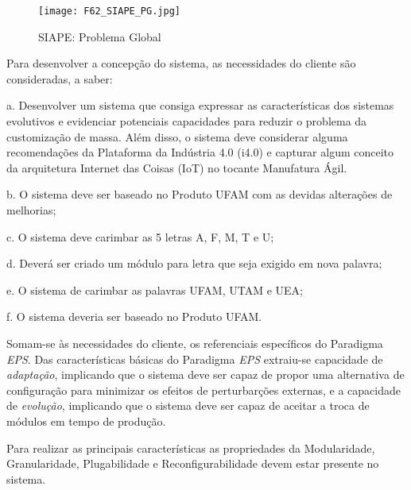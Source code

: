 \begin{figure}[!h]
	\centering
	\texttt{[image: F62\_SIAPE\_PG.jpg]} 
	\caption{SIAPE: Problema Global}
	\label{F62}
\end{figure}
Para desenvolver a concepção do sistema, as necessidades do cliente são consideradas, a saber:\par   	
a.	Desenvolver um sistema que consiga expressar as características dos sistemas evolutivos e evidenciar potenciais capacidades para reduzir o problema da customização de massa. Além disso, o sistema deve considerar alguma recomendações da Plataforma da Indústria 4.0 (i4.0) e capturar algum conceito da arquitetura Internet das Coisas (IoT) no tocante Manufatura Ágil. \par 
b.	O sistema deve ser baseado no Produto UFAM com as devidas alterações de melhorias; \par 
c.	O sistema deve carimbar as 5 letras A, F, M, T  e U; \par 
d.	Deverá ser criado um módulo para letra que seja exigido em nova palavra; \par 
e.	O sistema de carimbar as palavras UFAM, UTAM e UEA; \par 
f. O sistema deveria ser baseado no Produto UFAM.\par
Somam-se às necessidades do cliente, os referenciais específicos do Paradigma \textit{EPS}. Das características básicas do Paradigma \textit{EPS} extraiu-se capacidade de \textit{adaptação}, implicando que o sistema deve ser capaz de propor uma alternativa de configuração para minimizar os efeitos de perturbarções externas, e a capacidade de \textit{evolução}, implicando que o sistema deve ser capaz de aceitar a troca de módulos em tempo de produção. \par 

Para realizar as principais características as propriedades da Modularidade, Granularidade, Plugabilidade e Reconfigurabilidade devem estar presente no sistema.\par 
\ %
	
